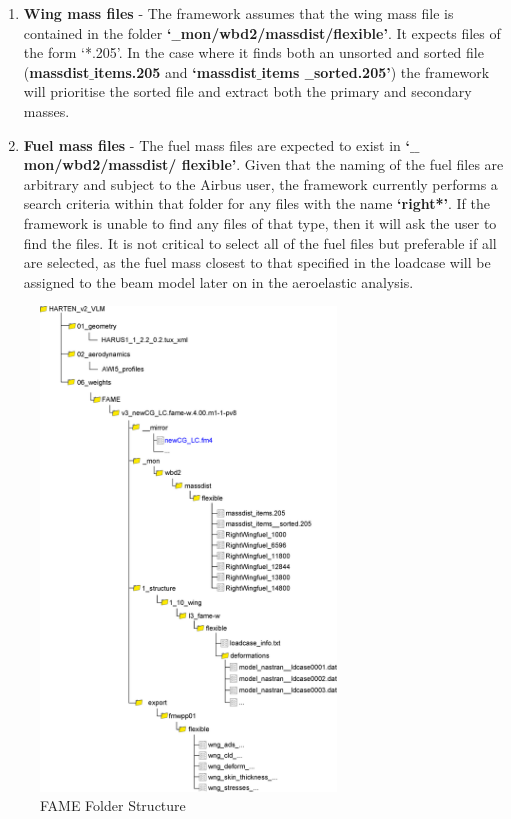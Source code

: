\begin{enumerate}
\begin{enumerate}
		\item \textbf{Wing mass files} - The framework assumes that the wing mass file is contained in the folder \textbf{`$\_\_$mon/wbd2/massdist/flexible'}. It expects files of the form `*.205'. In the case where it finds both an unsorted and sorted file (\textbf{massdist$\_$items.205} and \textbf{`massdist$\_$items $\_\_$sorted.205'}) the framework will prioritise the sorted file and extract both the primary and secondary masses.
		\item \textbf{Fuel mass files} - The fuel mass files are expected to exist in \textbf{`$\_\_$mon/wbd2/massdist/ flexible'}. Given that the naming of the fuel files are arbitrary and subject to the Airbus user, the framework currently performs a search criteria within that folder for any files with the name \textbf{`right*'}. If the framework is unable to find any files of that type, then it will ask the user to find the files. It is not critical to select all of the fuel files but preferable if all are selected, as the fuel mass closest to that specified in the loadcase will be assigned to the beam model later on in the aeroelastic analysis. 
	\end{enumerate}
\end{enumerate}
\begin{figure}[h!]
\centering
\includegraphics[width=0.7\textwidth]{FAMEFolderStructure}
\caption{FAME Folder Structure}\label{fig:FAMEFolderStructure}
\end{figure}

